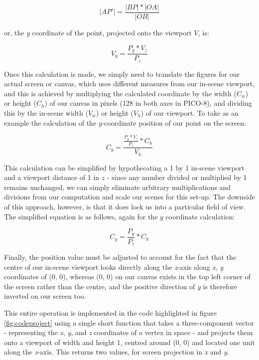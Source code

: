 \documentclass[11pt]{article}
\begin{document}
\begin{equation}
   |AP'| = \frac{|BP| * |OA|} {|OB|}
\end{equation}

or, the $y$ coordinate of the point, projected onto the viewport $V$, is:

\begin{equation}
   V_y = \frac{P_y * V_z} {P_z}
\end{equation}

Once this calculation is made, we simply need to translate the figures for our actual screen or canvas, which uses different
measures from our in-scene viewport, and this is achieved by multiplying the calculated coordinate by the width ($C_w$) or height 
($C_h$) of our canvas in pixels (128 in both axes in PICO-8), and dividing this by the in-scene width ($V_w$) or height ($V_h$) of
our viewport. To take as an example the calculation of the $y$-coordinate position of our point on the screen:

\begin{equation}
   C_y = \frac{\frac{P_y * V_z} {P_z} * C_h} {V_h}
\end{equation}

This calculation can be simplified by hypothecating a 1 by 1 in-scene viewport and
a viewport distance of 1 in $z$ - since any number divided or multiplied by 1 remains unchanged, we can simply eliminate
arbitrary multiplications and divisions from our computation and scale our scenes for this set-up. The downside of this approach,
however, is that it does lock us into a particular field of view. The simplified equation is as follows, again for the $y$ coordinate
calculation:

\begin{equation}
   C_y = \frac{P_y} {P_z} * C_h
\end{equation}

Finally, the position value must be adjusted to account for the fact that the centre of our in-scene viewport looks directly
along the \textit{z}-axis along \textit{x}, \textit{y} coordinates of (0, 0), whereas (0, 0) on our canvas exists
in the top left corner of the screen rather than the centre, and the positive direction of \textit{y} is therefore
inverted on our screen too.

This entire operation is implemented in the code highlighted in figure \ref{fig:codeproject} using a single short function
that takes a three-component vector - representing the \textit{x}, \textit{y}, and \textit{z} coordinates of a
vertex in space - and projects them onto a viewport of width and height 1, centred around (0, 0) and located
one unit along the \textit{z}-axis. This returns two values, for screen projection in \textit{x} and \textit{y}.
\end{document}
